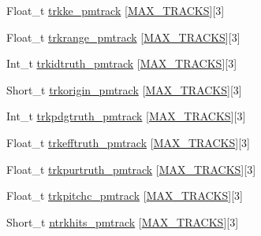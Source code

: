 \begin{DoxyCompactItemize}
\item 
Float\-\_\-t \hyperlink{classanatree_a356f241fe10ef56e6176bae32d45a35e}{trkke\-\_\-pmtrack} \mbox{[}\hyperlink{anatree__core__v09410002__orig_8h_a327fd4e796e4a0d78947524c96e4362e}{M\-A\-X\-\_\-\-T\-R\-A\-C\-K\-S}\mbox{]}\mbox{[}3\mbox{]}
\item 
Float\-\_\-t \hyperlink{classanatree_aea6afedcdbcb8d214b59f011942cbe21}{trkrange\-\_\-pmtrack} \mbox{[}\hyperlink{anatree__core__v09410002__orig_8h_a327fd4e796e4a0d78947524c96e4362e}{M\-A\-X\-\_\-\-T\-R\-A\-C\-K\-S}\mbox{]}\mbox{[}3\mbox{]}
\item 
Int\-\_\-t \hyperlink{classanatree_a69032230d4731245f88a9082578f4263}{trkidtruth\-\_\-pmtrack} \mbox{[}\hyperlink{anatree__core__v09410002__orig_8h_a327fd4e796e4a0d78947524c96e4362e}{M\-A\-X\-\_\-\-T\-R\-A\-C\-K\-S}\mbox{]}\mbox{[}3\mbox{]}
\item 
Short\-\_\-t \hyperlink{classanatree_a7cc04d8810c750538e720b7f681323ea}{trkorigin\-\_\-pmtrack} \mbox{[}\hyperlink{anatree__core__v09410002__orig_8h_a327fd4e796e4a0d78947524c96e4362e}{M\-A\-X\-\_\-\-T\-R\-A\-C\-K\-S}\mbox{]}\mbox{[}3\mbox{]}
\item 
Int\-\_\-t \hyperlink{classanatree_a4039f571e1c27da177332399f30633b5}{trkpdgtruth\-\_\-pmtrack} \mbox{[}\hyperlink{anatree__core__v09410002__orig_8h_a327fd4e796e4a0d78947524c96e4362e}{M\-A\-X\-\_\-\-T\-R\-A\-C\-K\-S}\mbox{]}\mbox{[}3\mbox{]}
\item 
Float\-\_\-t \hyperlink{classanatree_a99202f1b486359afbf859093f5ac605e}{trkefftruth\-\_\-pmtrack} \mbox{[}\hyperlink{anatree__core__v09410002__orig_8h_a327fd4e796e4a0d78947524c96e4362e}{M\-A\-X\-\_\-\-T\-R\-A\-C\-K\-S}\mbox{]}\mbox{[}3\mbox{]}
\item 
Float\-\_\-t \hyperlink{classanatree_a47b12693af49f90dada374e0d0f9105f}{trkpurtruth\-\_\-pmtrack} \mbox{[}\hyperlink{anatree__core__v09410002__orig_8h_a327fd4e796e4a0d78947524c96e4362e}{M\-A\-X\-\_\-\-T\-R\-A\-C\-K\-S}\mbox{]}\mbox{[}3\mbox{]}
\item 
Float\-\_\-t \hyperlink{classanatree_aa842f0282de766208616772211b5e34f}{trkpitchc\-\_\-pmtrack} \mbox{[}\hyperlink{anatree__core__v09410002__orig_8h_a327fd4e796e4a0d78947524c96e4362e}{M\-A\-X\-\_\-\-T\-R\-A\-C\-K\-S}\mbox{]}\mbox{[}3\mbox{]}
\item 
Short\-\_\-t \hyperlink{classanatree_ae637a1305dfcb662e4696778c24e6972}{ntrkhits\-\_\-pmtrack} \mbox{[}\hyperlink{anatree__core__v09410002__orig_8h_a327fd4e796e4a0d78947524c96e4362e}{M\-A\-X\-\_\-\-T\-R\-A\-C\-K\-S}\mbox{]}\mbox{[}3\mbox{]}
\item 

\end{DoxyCompactItemize}

